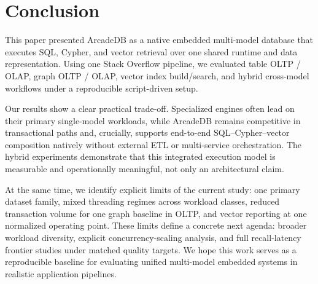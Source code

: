 \documentclass[sigconf, nonacm]{acmart}
\begin{document}
\section{Conclusion}

This paper presented ArcadeDB as a native embedded multi-model database that executes SQL, Cypher, and vector retrieval over one shared runtime and data representation. Using one Stack Overflow pipeline, we evaluated table OLTP / OLAP, graph OLTP / OLAP, vector index build/search, and hybrid cross-model workflows under a reproducible script-driven setup.

Our results show a clear practical trade-off. Specialized engines often lead on their primary single-model workloads, while ArcadeDB remains competitive in transactional paths and, crucially, supports end-to-end SQL--Cypher--vector composition natively without external ETL or multi-service orchestration. The hybrid experiments demonstrate that this integrated execution model is measurable and operationally meaningful, not only an architectural claim.

At the same time, we identify explicit limits of the current study: one primary dataset family, mixed threading regimes across workload classes, reduced transaction volume for one graph baseline in OLTP, and vector reporting at one normalized operating point. These limits define a concrete next agenda: broader workload diversity, explicit concurrency-scaling analysis, and full recall-latency frontier studies under matched quality targets. We hope this work serves as a reproducible baseline for evaluating unified multi-model embedded systems in realistic application pipelines.




\end{document}
